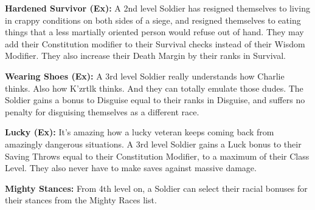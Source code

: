 \textbf{Hardened Survivor (Ex):} A 2nd level Soldier has resigned themselves to living in crappy conditions on both sides of a siege, and resigned themselves to eating things that a less martially oriented person would refuse out of hand. They may add their Constitution modifier to their Survival checks instead of their Wisdom Modifier. They also increase their Death Margin by their ranks in Survival.

\textbf{Wearing Shoes (Ex):} A 3rd level Soldier really understands how Charlie thinks. Also how K'zrtlk thinks. And they can totally emulate those dudes. The Soldier gains a bonus to Disguise equal to their ranks in Disguise, and suffers no penalty for disguising themselves as a different race.

\textbf{Lucky (Ex):} It's amazing how a lucky veteran keeps coming back from amazingly dangerous situations. A 3rd level Soldier gains a Luck bonus to their Saving Throws equal to their Constitution Modifier, to a maximum of their Class Level. They also never have to make saves against massive damage.

\textbf{Mighty Stances:} From 4th level on, a Soldier can select their racial bonuses for their stances from the Mighty Races list.

